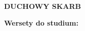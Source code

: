 \documentclass[10pt,a4paper,oneside]{article}
\begin{document}
\centerline{\textbf{\MakeUppercase{Duchowy skarb}}}
\begin{center}
\textbf{Wersety do studium:} 

\end{center}
\end{document}
